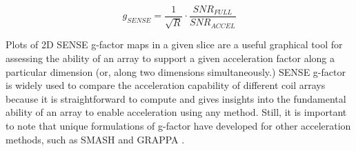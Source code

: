 \begin{equation}\label{eq:SENSE_g}
    g_{SENSE} = \frac{1}{\sqrt{R}} \cdot \frac{SNR_{FULL}}{SNR_{ACCEL}}
\end{equation}

Plots of 2D SENSE g-factor maps in a given slice are a useful graphical tool for assessing the ability of an array to support
a given acceleration factor along a particular dimension (or, along two dimensions simultaneously.) SENSE g-factor is
widely used to compare the acceleration capability of different coil arrays because it is straightforward to compute and
gives insights into the fundamental ability of an array to enable acceleration using any method. Still, it is important
to note that unique formulations of g-factor have developed for other acceleration methods, such as SMASH and GRAPPA \cite{Breuer2009}.

